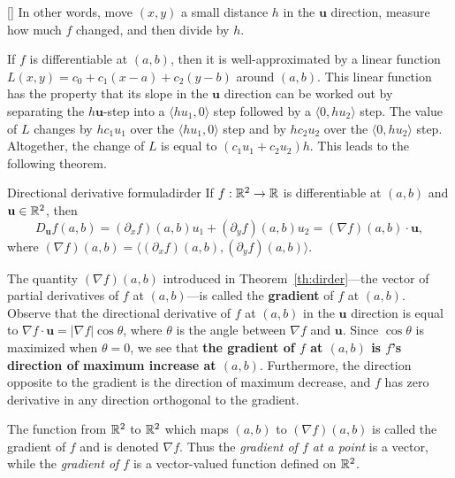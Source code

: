 \documentclass[prettycode,shellescape]{watsonbook}
\begin{document}
\begin{insetfigure}{\usebox{\asybox}}[]
  In other words, move $(x,y)$ a small distance $h$ in the
  $\mathbf{u}$ direction, measure how much $f$ changed, and then
  divide by $h$.

  If $f$ is differentiable at $(a,b)$, then it is well-approximated
  by a linear function $L(x,y) = c_0 + c_1(x-a) + c_2(y-b)$ around
  $(a,b)$. This linear function has the property that its slope in
  the $\mathbf{u}$ direction can be worked out by separating the
  $h\mathbf{u}$-step into a $\langle hu_1, 0 \rangle$ step followed
  by a $\langle 0, hu_2 \rangle$ step. The value of $L$ changes by
  $hc_1u_1$ over the $\langle hu_1, 0 \rangle$ step and by
  $hc_2u_2$ over the $\langle 0, hu_2 \rangle$ step. Altogether, the
  change of $L$ is equal to $(c_1u_1 + c_2u_2 )h$. This
  leads to the following theorem.
\end{insetfigure}

\begin{theo}{Directional derivative formula}{dirder}
  If $f:\mathbb{R}^2 \to \mathbb{R}$ is differentiable at $(a,b)$ and
  $ \mathbf{u} \in \mathbb{R}^2$, then
  \[
    D_{\mathbf{u}} f(a,b) = (\partial_xf)(a,b)u_1 +
    (\partial_yf)(a,b)u_2 =  (\nabla f)(a,b) \cdot \mathbf{u}, 
  \]
  where $(\nabla f)(a,b)= \langle (\partial_x f)(a,b), (\partial_y f)(a,b) \rangle$. 
\end{theo}


The quantity $(\nabla f)(a,b)$ introduced in
Theorem~\ref{th:dirder}---the vector of partial derivatives of $f$
at $(a,b)$---is called the \textbf{gradient} of $f$ at
$(a,b)$. Observe that the directional derivative of $f$ at $(a,b)$
in the $\mathbf{u}$ direction is equal to
$\nabla f \cdot \mathbf{u} = |\nabla f| \cos \theta$, where $\theta$
is the angle between $\nabla f$ and $\mathbf{u}$. Since $\cos\theta$
is maximized when $\theta = 0$, we see that \textbf{the gradient of
  $f$ at $(a,b)$ is $f$'s direction of maximum increase at
  $(a,b)$}. Furthermore, the direction opposite to the gradient is
the direction of maximum decrease, and $f$ has zero derivative in
any direction orthogonal to the gradient. \bang{-10mm}

The function from $\mathbb{R}^2$ to $\mathbb{R}^2$ which maps $(a,b)$ to $(\nabla
f)(a,b)$ is called the gradient of $f$ and is denoted $\nabla
f$. Thus the \textit{gradient  of $f$ at a point} is a vector, while
the \textit{gradient of $f$} is a vector-valued function defined on
$\mathbb{R}^2$. 
\end{document}
